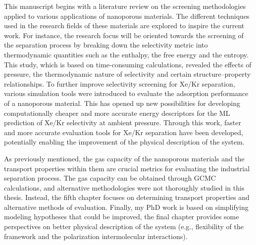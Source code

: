 \begin{center}
\end{center}

This manuscript begins with a literature review on the screening methodologies applied to various applications of nanoporous materials. The different techniques used in the research fields of these materials are explored to inspire the current work.\autocite{Ren_2022} For instance, the research focus will be oriented towards the screening of the separation process by breaking down the selectivity metric into thermodynamic quantities such as the enthalpy, the free energy and the entropy. This study, which is based on time-consuming calculations, revealed the effects of pressure, the thermodynamic nature of selectivity and certain structure--property relationships.\autocite{Ren_2021} To further improve selectivity screening for Xe/Kr separation, various simulation tools were introduced to evaluate the adsorption performance of a nanoporous material.\autocite{Ren_2023} This has opened up new possibilities for developing computationally cheaper and more accurate energy descriptors for the ML prediction of Xe/Kr selectivity at ambient pressure.\autocite{Ren_2023_ml} Through this work, faster and more accurate evaluation tools for Xe/Kr separation have been developed, potentially enabling the improvement of the physical description of the system. 

As previously mentioned, the gas capacity of the nanoporous materials and the transport properties within them are crucial metrics for evaluating the industrial separation process. The gas capacity can be obtained through GCMC calculations, and alternative methodologies were not thoroughly studied in this thesis. Instead, the fifth chapter focuses on determining transport properties and alternative methods of evaluation. Finally, my PhD work is based on simplifying modeling hypotheses that could be improved, the final chapter provides some perspectives on better physical description of the system (e.g., flexibility of the framework and the polarization intermolecular interactions).


\vfill
\begin{center}
\end{center}
\vfill\vfill